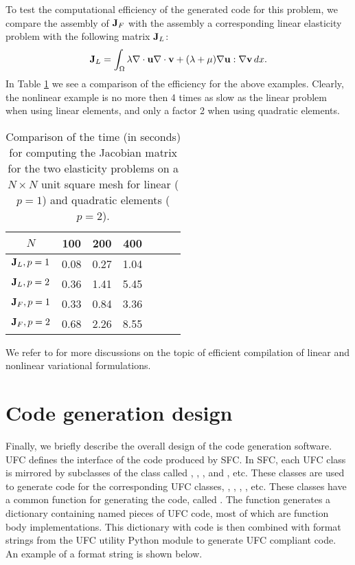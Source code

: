 To test the computational efficiency of the generated code
for this problem, we compare the assembly of $\mathbf{J}_F$ with the assembly a corresponding linear
elasticity problem with the following matrix $\mathbf{J}_L$:
\[
\mathbf{J}_L = \int_\Omega \lambda \nabla \cdot \mathbf{u} \nabla \cdot \mathbf{v} + (\lambda + \mu)\nabla \mathbf{u}:\nabla \mathbf{v} \, dx . 
\]
In Table \ref{SFCtest} we see a comparison of the efficiency for the above examples. 
Clearly, the nonlinear example is no more then 4 times as slow as the linear problem when using linear elements, and only a factor 2 when 
using quadratic elements. 
\begin{table}[h]
\begin{center}
\begin{tabular}{|c|c|c|c|c|c|c|} \hline
$N$              & 100   & 200  & 400    \\ \hline 
$\mathbf{J}_L, p=1$     & 0.08  & 0.27  & 1.04     \\ \hline 
$\mathbf{J}_L, p=2$     & 0.36  & 1.41  & 5.45      \\ \hline 
$\mathbf{J}_F, p=1$     & 0.33  & 0.84  & 3.36     \\ \hline 
$\mathbf{J}_F, p=2$     & 0.68  & 2.26  & 8.55     \\ \hline 
\end{tabular}
\caption{Comparison of the time (in seconds) for computing the Jacobian matrix for 
the two elasticity problems on a $N\times N$ unit square mesh for linear ($p=1$) and quadratic elements ($p=2$).} 
\label{SFCtest}
\end{center}
\end{table}

We refer to
\citep{AlnaesMardal2009b,OelgaardLoggWells2008,KirbyLogg2008,OelgaardWells2010}   
for more discussions on the topic of efficient compilation of linear and nonlinear variational formulations. 



\section{Code generation design}



Finally, we briefly describe the overall design of the code generation software.
UFC defines the interface of the code produced by SFC. 
In SFC, each UFC class is mirrored by  subclasses of the class  called 
, , , and , etc. 
These classes are used 
to generate code for the corresponding UFC classes, , , , 
, etc. These classes have 
a common function for generating the code, called .  
The function  generates a dictionary containing named
pieces of UFC code, most of which are function body implementations.
This dictionary with code is then combined with format strings from the
UFC utility Python module to generate UFC compliant code.  
An example of a format string is shown below.

